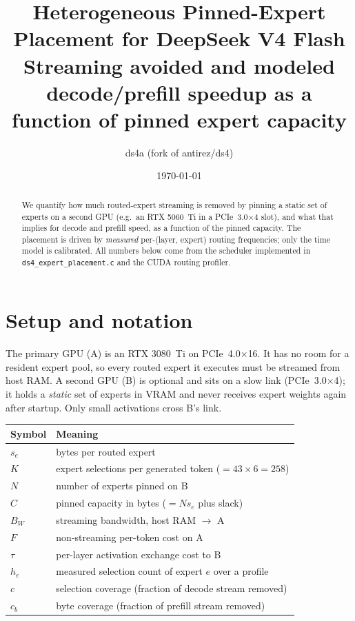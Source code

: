 \documentclass[11pt]{article}
\title{Heterogeneous Pinned-Expert Placement for DeepSeek V4 Flash\\
\large Streaming avoided and modeled decode/prefill speedup as a function
of pinned expert capacity}
\author{ds4a (fork of antirez/ds4)}
\date{\today}
\begin{document}
\maketitle

\begin{abstract}
We quantify how much routed-expert streaming is removed by pinning a static
set of experts on a second GPU (e.g.\ an RTX 5060~Ti in a PCIe~3.0$\times$4
slot), and what that implies for decode and prefill speed, as a function of
the pinned capacity. The placement is driven by \emph{measured} per-(layer,
expert) routing frequencies; only the time model is calibrated. All numbers
below come from the scheduler implemented in
\texttt{ds4\_expert\_placement.c} and the CUDA routing profiler.
\end{abstract}

\section{Setup and notation}

The primary GPU (A) is an RTX 3080~Ti on PCIe~4.0$\times$16. It has no room
for a resident expert pool, so every routed expert it executes must be
streamed from host RAM. A second GPU (B) is optional and sits on a slow link
(PCIe~3.0$\times$4); it holds a \emph{static} set of experts in VRAM and never
receives expert weights again after startup. Only small activations cross B's
link.

\begin{center}
\begin{tabular}{ll}
\toprule
Symbol & Meaning \\
\midrule
$s_e$ & bytes per routed expert \\
$K$ & expert selections per generated token ($=43\times 6=258$) \\
$N$ & number of experts pinned on B \\
$C$ & pinned capacity in bytes ($= N s_e$ plus slack) \\
$B_W$ & streaming bandwidth, host RAM $\to$ A \\
$F$ & non-streaming per-token cost on A \\
$\tau$ & per-layer activation exchange cost to B \\
$h_e$ & measured selection count of expert $e$ over a profile \\
$c$ & selection coverage (fraction of decode stream removed) \\
$c_b$ & byte coverage (fraction of prefill stream removed) \\
\bottomrule
\end{tabular}
\end{center}
\end{document}
